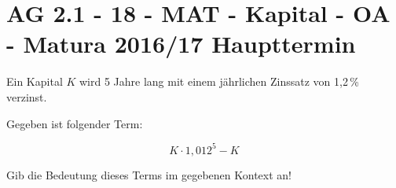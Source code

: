 \section{AG 2.1 - 18 - MAT - Kapital - OA - Matura 2016/17 Haupttermin}

\begin{beispiel}[AG 2.1]{1} %
Ein Kapital $K$ wird 5 Jahre lang mit einem jährlichen Zinssatz von 1,2\,\% verzinst.
			
Gegeben ist folgender Term:

\[K\cdot 1,012^5-K\] 

Gib die Bedeutung dieses Terms im gegebenen Kontext an!

\end{beispiel}